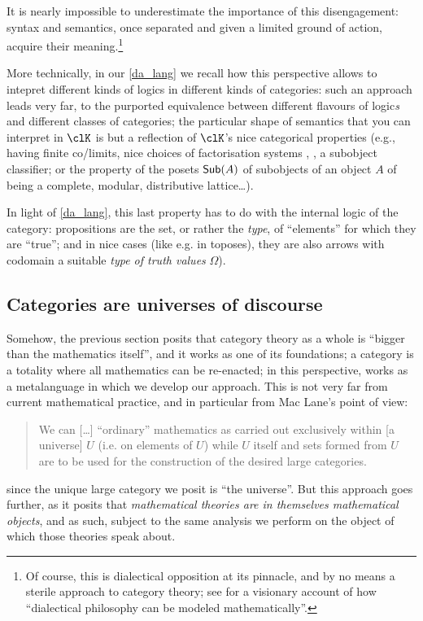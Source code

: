 It is nearly impossible to underestimate the importance of this disengagement: syntax and semantics, once separated and given a limited ground of action, acquire their meaning.\footnote{Of course, this is dialectical opposition at its pinnacle, and by no means a sterile approach to category theory; see \cite{lawvere1996unity} for a visionary account of how ``dialectical philosophy can be modeled mathematically''.}

More technically, in our \autoref{da_lang} we recall how this perspective allows to intepret different kinds of logics in different kinds of categories: such an approach leads very far, to the purported equivalence between different flavours of logic\emph{s} and different classes of categories; the particular shape of semantics that you can interpret in $\clK$ is but a reflection of $\clK$'s nice categorical properties (e.g., having finite co/limits, nice choices of factorisation systems \cite[5.5]{Bor1}, \cite{FK}, a subobject classifier; or the property of the posets $\mathsf{Sub}(A)$ of subobjects of an object $A$ of being a complete, modular, distributive lattice\dots).

In light of \autoref{da_lang}, this last property has to do with the internal logic of the category: propositions are the set, or rather the \emph{type}, of ``elements'' for which they are ``true''; and in nice cases (like e.g. in toposes), they are also arrows with codomain a suitable \emph{type of truth values} $\Omega$).
\subsection{Categories are universes of discourse}
Somehow, the previous section posits that category theory as a whole is ``bigger than the mathematics itself'', and it works as one of its foundations; a category is a totality where all mathematics can be re-enacted; in this perspective,  works as a metalanguage in which we develop our approach. This is not very far from current mathematical practice, and in particular from Mac Lane's point of view:
\begin{quote}
	We can [\dots\unkern] ``ordinary'' mathematics as carried out exclusively within [a universe] $U$ (i.e. on elements of $U$) while $U$ itself and sets formed from $U$ are to be used for the construction of the desired large categories.\hfill \cite[I.6]{McL}
\end{quote}
since the unique large category we posit is ``the universe''. But this approach goes further, as it posits that \emph{mathematical theories are in themselves mathematical objects}, and as such, subject to the same analysis we perform on the object of which those theories speak about.

